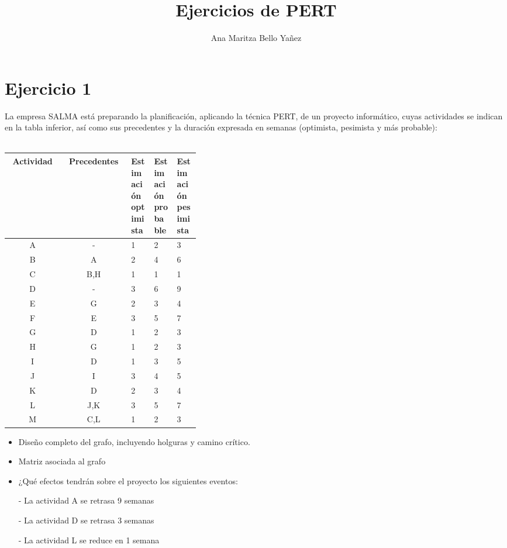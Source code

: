 \documentclass[12pt]{article}
\begin{document}
\title{Ejercicios de PERT}
\author{Ana Maritza Bello Yañez}
\maketitle


\section{Ejercicio 1}
La empresa SALMA está preparando la planificación, aplicando la técnica PERT, de
un proyecto informático, cuyas actividades se indican en la tabla inferior, así
como sus precedentes y la duración expresada en semanas (optimista, pesimista y
más probable):  \\
\\

\begin{tabular}{ccp{0.125\linewidth}p{0.125\linewidth}p{0.125\linewidth}}
Actividad &   Precedentes   &   Estimación optimista    &   Estimación probable
&   Estimación pesimista \\
\hline
A   &    -   &   1   &   2   &   3   \\
B   &    A   &   2   &   4   &   6   \\
C   &   B,H  &   1   &   1   &   1   \\
D   &    -   &   3   &   6   &   9   \\
E   &    G   &   2   &   3   &   4   \\
F   &    E   &   3   &   5   &   7   \\
G   &    D   &   1   &   2   &   3   \\
H   &    G   &   1   &   2   &   3   \\
I   &    D   &   1   &   3   &   5   \\
J   &    I   &   3   &   4   &   5   \\
K   &    D   &   2   &   3   &   4   \\
L   &   J,K  &   3   &   5   &   7   \\
M   &   C,L  &   1   &   2   &   3   \\
\end{tabular}

\begin{itemize}
    \item Diseño completo del grafo, incluyendo holguras y camino crítico.
    \item Matriz asociada al grafo
    \item ¿Qué efectos tendrán sobre el proyecto los siguientes eventos:
    
    - La actividad A se retrasa 9 semanas

    - La actividad D se retrasa 3 semanas

    - La actividad L se reduce en 1 semana

\end{itemize}
\end{document}
